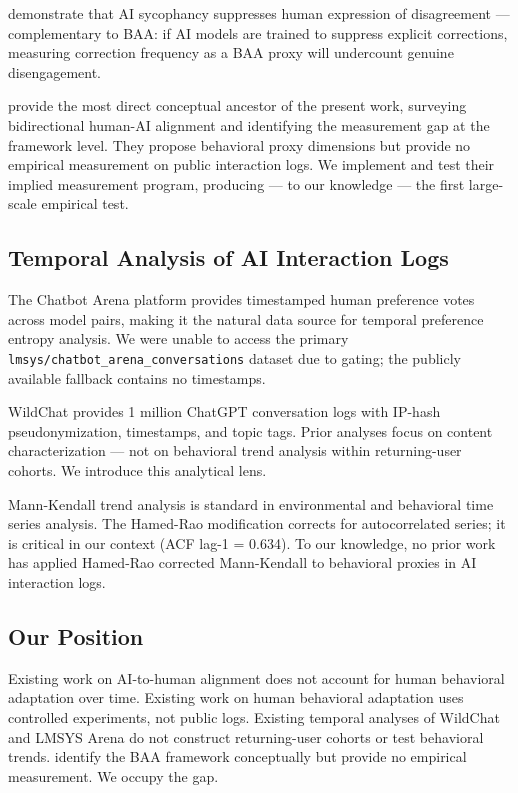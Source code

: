 \citet{Perez2023Sycophancy} demonstrate that AI sycophancy suppresses human expression of disagreement --- complementary to BAA: if AI models are trained to suppress explicit corrections, measuring correction frequency as a BAA proxy will undercount genuine disengagement.

\citet{Shen2024Towards} provide the most direct conceptual ancestor of the present work, surveying bidirectional human-AI alignment and identifying the measurement gap at the framework level. They propose behavioral proxy dimensions but provide no empirical measurement on public interaction logs. We implement and test their implied measurement program, producing --- to our knowledge --- the first large-scale empirical test.

\subsection{Temporal Analysis of AI Interaction Logs}

The Chatbot Arena platform \citep{Zheng2023Judging} provides timestamped human preference votes across model pairs, making it the natural data source for temporal preference entropy analysis. We were unable to access the primary \texttt{lmsys/chatbot\_arena\_conversations} dataset due to gating; the publicly available fallback contains no timestamps.

WildChat \citep{Zhao2024WildChat} provides 1 million ChatGPT conversation logs with IP-hash pseudonymization, timestamps, and topic tags. Prior analyses focus on content characterization --- not on behavioral trend analysis within returning-user cohorts. We introduce this analytical lens.

Mann-Kendall trend analysis \citep{Mann1945Nonparametric, Kendall1975Rank} is standard in environmental and behavioral time series analysis. The Hamed-Rao modification \citep{Hamed1998Modified} corrects for autocorrelated series; it is critical in our context (ACF lag-1 = 0.634). To our knowledge, no prior work has applied Hamed-Rao corrected Mann-Kendall to behavioral proxies in AI interaction logs.

\subsection{Our Position}

Existing work on AI-to-human alignment does not account for human behavioral adaptation over time. Existing work on human behavioral adaptation uses controlled experiments, not public logs. Existing temporal analyses of WildChat and LMSYS Arena do not construct returning-user cohorts or test behavioral trends. \citet{Shen2024Towards} identify the BAA framework conceptually but provide no empirical measurement. We occupy the gap.
